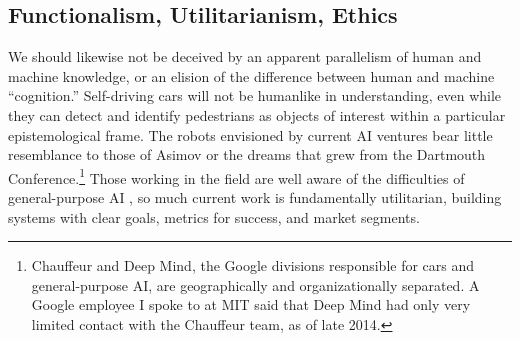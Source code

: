 \subsection{Functionalism, Utilitarianism, Ethics} 


We should likewise not be deceived by an apparent parallelism of human
and machine knowledge, or an elision of the difference between human
and machine ``cognition.'' Self-driving cars will not be humanlike in
understanding, even while they can detect and identify pedestrians as
objects of interest within a particular epistemological frame. The
robots envisioned by current AI 
ventures bear little resemblance to those of Asimov or the dreams that grew
from the Dartmouth Conference.\footnote{Chauffeur and Deep Mind, the
  Google divisions responsible for cars and general-purpose AI, are
geographically and organizationally separated. A Google
employee I spoke to at MIT said that Deep Mind had only very limited
contact with the Chauffeur team, as of late 2014.}  Those working
in the field are well aware of 
the difficulties of general-purpose AI \cite{sofgeAIFears}, so much
current work is 
fundamentally utilitarian, building systems with clear goals, metrics
for success, and market segments.


